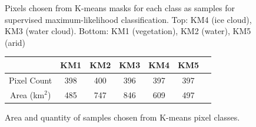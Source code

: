 \documentclass[12pt]{article}
\begin{document}
\begin{figure}[h!]
\begin{center}
{        }
    \end{center}

    \caption{Pixels chosen from K-means masks for each class as samples for supervised maximum-likelihood classification. Top: KM4 (ice cloud), KM3 (water cloud). Bottom: KM1 (vegetation), KM2 (water), KM5 (arid)}
    \label{thresh_samples}
\end{figure}

\begin{figure}[h!]
    \centering
    \begin{tabular}{c|cccccc}
    & KM1 & KM2 & KM3 & KM4 & KM5 \\
    \hline
    Pixel Count & 398 & 400 & 396 & 397 & 397\\
    Area (km$^2$) & 485 & 747 & 846 & 609 & 497\\
    \end{tabular}
    \caption{Area and quantity of samples chosen from K-means pixel classes.}
    \label{sample_km_areas}
\end{figure}

\clearpage

\begin{figure}[h!]
    \centering

    \begin{center}
    \end{center}

    \caption{}
    \label{mlc_thresh_spectra}
\end{figure}
\end{document}
